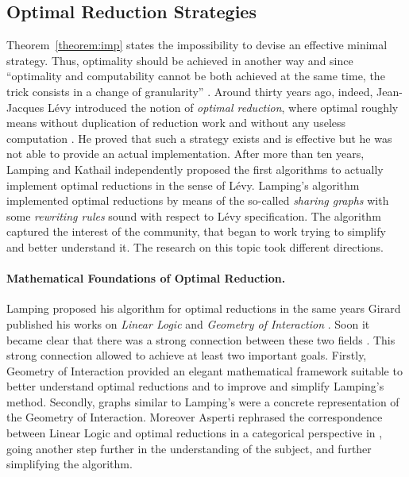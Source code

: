 \begin{LONG}
	\subsection{Optimal Reduction Strategies}
	Theorem~\ref{theorem:imp} states the impossibility to devise an effective minimal strategy. Thus, optimality should be achieved in another way and since ``optimality and computability cannot be both achieved at the same time, the trick consists in a change of granularity'' \cite{terese_term_2003}. Around thirty years ago, indeed, Jean-Jacques Lévy introduced the notion of \emph{optimal reduction}, where optimal roughly means without duplication of reduction work and without any useless computation \cite{levy_reductions_1978}. He proved that such a strategy exists and is effective but he was not able to provide an actual implementation. After more than ten years, Lamping \cite{lamping_algorithm_1990} and Kathail \cite{kathail_optimal_1990} independently proposed the first algorithms to actually implement optimal reductions in the sense of Lévy. Lamping's algorithm implemented optimal reductions by means of the so-called \emph{sharing graphs} with some \emph{rewriting rules} sound with respect to Lévy specification. The algorithm captured the interest of the community, that began to work trying to simplify and better understand it. The research on this topic took different directions.
	\paragraph{Mathematical Foundations of Optimal Reduction.}Lamping proposed his algorithm for optimal reductions in the same years Girard published his works on \emph{Linear Logic} \cite{girard_linear_1987} and \emph{Geometry of Interaction} \cite{girard_geometry_1989}. Soon it became clear that there was a strong connection between these two fields \cite{gonthier_geometry_1992}. This strong connection allowed to achieve at least two important goals. Firstly, Geometry of Interaction provided an elegant mathematical framework suitable to better understand optimal reductions and to improve and simplify Lamping's method. Secondly, graphs similar to Lamping's were a concrete representation of the Geometry of Interaction. Moreover Asperti rephrased the correspondence between Linear Logic and optimal reductions in a categorical perspective in \cite{asperti_linear_1995}, going another step further in the understanding of the subject, and further simplifying the algorithm.

\end{LONG}
